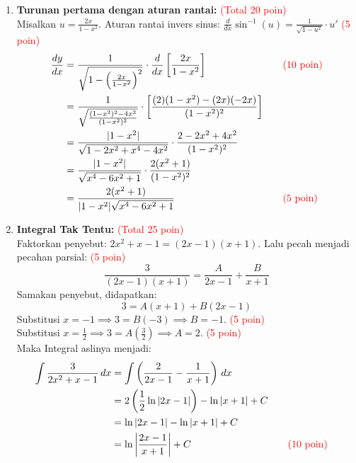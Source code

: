 ﻿\documentclass[a4paper,12pt]{article}
\begin{document}
\begin{enumerate}
  \item \textbf{Turunan pertama dengan aturan rantai:} \textcolor{red}{(Total 20 poin)}\\
        Misalkan $u = \frac{2x}{1-x^2}$. Aturan rantai invers sinus: $\frac{d}{dx}\sin^{-1}(u) = \frac{1}{\sqrt{1-u^2}} \cdot u'$ \textcolor{red}{(5 poin)}
        \begin{align*}
          \frac{dy}{dx} & = \frac{1}{\sqrt{1 - \left( \frac{2x}{1 - x^2} \right)^2}} \cdot \frac{d}{dx}\left[ \frac{2x}{1 - x^2} \right]              &  & \textcolor{red}{\quad (10 \text{ poin})} \\
                        & = \frac{1}{\sqrt{\frac{(1 - x^2)^2 - 4x^2}{(1 - x^2)^2}}} \cdot \left[ \frac{(2)(1 - x^2) - (2x)(-2x)}{(1 - x^2)^2} \right]                                               \\
                        & = \frac{|1 - x^2|}{\sqrt{1 - 2x^2 + x^4 - 4x^2}} \cdot \frac{2 - 2x^2 + 4x^2}{(1 - x^2)^2}                                                                                \\
                        & = \frac{|1 - x^2|}{\sqrt{x^4 - 6x^2 + 1}} \cdot \frac{2(x^2 + 1)}{(1 - x^2)^2}                                                                                            \\
                        & = \frac{2(x^2 + 1)}{|1 - x^2| \sqrt{x^4 - 6x^2 + 1}}                                                                        &  & \textcolor{red}{\quad (5 \text{ poin})}
        \end{align*}

  \item \textbf{Integral Tak Tentu:} \textcolor{red}{(Total 25 poin)} \\
        Faktorkan penyebut: $2x^2 + x - 1 = (2x-1)(x+1)$. Lalu pecah menjadi pecahan parsial: \textcolor{red}{(5 poin)}
        \[
          \frac{3}{(2x-1)(x+1)} = \frac{A}{2x-1} + \frac{B}{x+1}
        \]
        Samakan penyebut, didapatkan:
        \[
          3 = A(x+1) + B(2x-1)
        \]
        Substitusi $x = -1 \implies 3 = B(-3) \implies B = -1$. \textcolor{red}{(5 poin)} \\
        Substitusi $x = \frac{1}{2} \implies 3 = A\left(\frac{3}{2}\right) \implies A = 2$. \textcolor{red}{(5 poin)} \\
        Maka Integral aslinya menjadi:
        \begin{align*}
          \int \frac{3}{2x^2 + x - 1}\,dx & = \int \left( \frac{2}{2x-1} - \frac{1}{x+1} \right)\,dx                                               \\
                                          & = 2 \left( \frac{1}{2}\ln|2x-1| \right) - \ln|x+1| + C                                                 \\
                                          & = \ln|2x-1| - \ln|x+1| + C                                                                             \\
                                          & = \ln\left| \frac{2x-1}{x+1} \right| + C                 &  & \textcolor{red}{\quad (10 \text{ poin})}
        \end{align*}


\end{enumerate}
\end{document}
